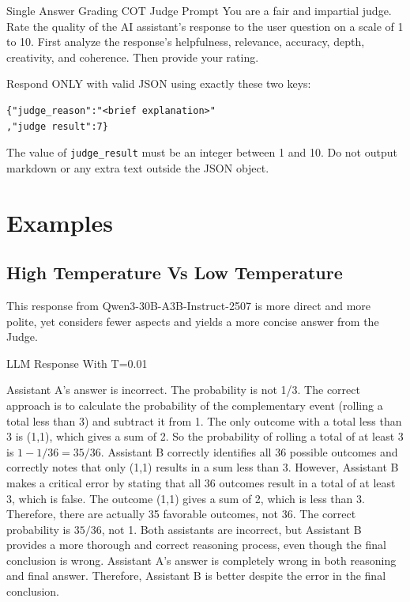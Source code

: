 \documentclass[11pt]{article}
\begin{document}
\begin{userbox}{Single Answer Grading COT Judge Prompt}
You are a fair and impartial judge. Rate the quality of the AI assistant's response to the user question on a scale of 1 to 10. First analyze the response's helpfulness, relevance, accuracy, depth, creativity, and coherence. Then provide your rating.

Respond ONLY with valid JSON using exactly these two keys:
\begin{verbatim}
{"judge_reason":"<brief explanation>"
,"judge result":7}
\end{verbatim}

The value of \texttt{judge\_result} must be an integer between 1 and 10.
Do not output markdown or any extra text outside the JSON object.
\end{userbox}


\section{Examples}
\subsection{High Temperature Vs Low Temperature}
\label{sec:high vs low}

This response from Qwen3-30B-A3B-Instruct-2507 is more direct and more polite, yet considers fewer aspects and yields a more concise answer from the Judge.
\begin{responsebox}{LLM Response With T=0.01}

Assistant A's answer is incorrect. The probability is not 1/3. The correct approach is to calculate
the probability of the complementary event (rolling a total less than 3) and subtract it from 1. The
only outcome with a total less than 3 is (1,1), which gives a sum of 2. So the probability of
rolling a total of at least 3 is $1 - 1/36 = 35/36$. Assistant B correctly identifies all 36 possible
outcomes and correctly notes that only (1,1) results in a sum less than 3. However, Assistant B
makes a critical error by stating that all 36 outcomes result in a total of at least 3, which is
false. The outcome (1,1) gives a sum of 2, which is less than 3. Therefore, there are actually 35
favorable outcomes, not 36. The correct probability is $35/36$, not 1. Both assistants are incorrect,
but Assistant B provides a more thorough and correct reasoning process, even though the final
conclusion is wrong. Assistant A's answer is completely wrong in both reasoning and final answer.
Therefore, Assistant B is better despite the error in the final conclusion.
\end{responsebox}
\end{document}
